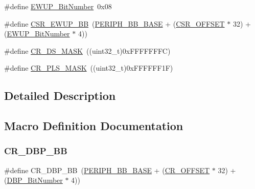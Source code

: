 \begin{DoxyCompactItemize}
\item 
\#define \hyperlink{group___p_w_r___private___defines_ga94fe0520e8f9b71fa2b99c0565ec70ea}{E\+W\+U\+P\+\_\+\+Bit\+Number}~0x08
\item 
\#define \hyperlink{group___p_w_r___private___defines_gaaff864595f697850b19173b0bca991b0}{C\+S\+R\+\_\+\+E\+W\+U\+P\+\_\+\+BB}~(\hyperlink{group___peripheral__memory__map_gaed7efc100877000845c236ccdc9e144a}{P\+E\+R\+I\+P\+H\+\_\+\+B\+B\+\_\+\+B\+A\+SE} + (\hyperlink{group___r_c_c___private___defines_ga984cbe73312b6d3d355c5053763d499a}{C\+S\+R\+\_\+\+O\+F\+F\+S\+ET} $\ast$ 32) + (\hyperlink{group___p_w_r___private___defines_ga94fe0520e8f9b71fa2b99c0565ec70ea}{E\+W\+U\+P\+\_\+\+Bit\+Number} $\ast$ 4))
\item 
\#define \hyperlink{group___p_w_r___private___defines_ga8ee6bf9218f3c476629dd9ee70deef21}{C\+R\+\_\+\+D\+S\+\_\+\+M\+A\+SK}~((uint32\+\_\+t)0x\+F\+F\+F\+F\+F\+F\+F\+C)
\item 
\#define \hyperlink{group___p_w_r___private___defines_gac4a30eebdd1d292331a578b189962e77}{C\+R\+\_\+\+P\+L\+S\+\_\+\+M\+A\+SK}~((uint32\+\_\+t)0x\+F\+F\+F\+F\+F\+F1\+F)
\end{DoxyCompactItemize}


\subsection{Detailed Description}


\subsection{Macro Definition Documentation}
\mbox{\label{group___p_w_r___private___defines_ga799ab60bdbcfc1076cf2d7f206d09b0c}} 
\subsubsection{\texorpdfstring{C\+R\+\_\+\+D\+B\+P\+\_\+\+BB}{CR\_DBP\_BB}}
{\footnotesize\ttfamily \#define C\+R\+\_\+\+D\+B\+P\+\_\+\+BB~(\hyperlink{group___peripheral__memory__map_gaed7efc100877000845c236ccdc9e144a}{P\+E\+R\+I\+P\+H\+\_\+\+B\+B\+\_\+\+B\+A\+SE} + (\hyperlink{group___r_c_c___private___defines_gafa1d3d0ea72132df651c76fc1bdffffc}{C\+R\+\_\+\+O\+F\+F\+S\+ET} $\ast$ 32) + (\hyperlink{group___p_w_r___private___defines_ga36ff45d972bf94f31f172fd53cf44d23}{D\+B\+P\+\_\+\+Bit\+Number} $\ast$ 4))}



